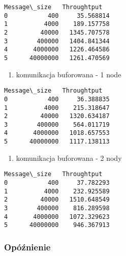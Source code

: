 \documentclass[11pt]{article}
\providecommand{\tightlist}{%
      \setlength{\itemsep}{0pt}\setlength{\parskip}{0pt}}
\begin{document}
            \begin{tcolorbox}[breakable, size=fbox, boxrule=.5pt, pad at break*=1mm, opacityfill=0]
\begin{Verbatim}[commandchars=\\\{\}]
   Message\_size   Throughtput
0           400     35.568814
1          4000    189.157758
2         40000   1345.707578
3        400000   1404.841344
4       4000000   1226.464586
5      40000000   1261.470569
\end{Verbatim}
\end{tcolorbox}
        
    \begin{enumerate}
\def\labelenumi{\arabic{enumi}.}
\setcounter{enumi}{2}
\tightlist
\item
  komunikacja buforowana - 1 node
\end{enumerate}

            \begin{tcolorbox}[breakable, size=fbox, boxrule=.5pt, pad at break*=1mm, opacityfill=0]
\begin{Verbatim}[commandchars=\\\{\}]
   Message\_size   Throughtput
0           400     36.388835
1          4000    215.318647
2         40000   1320.634187
3        400000    564.011719
4       4000000   1018.657553
5      40000000   1117.138113
\end{Verbatim}
\end{tcolorbox}
        
    \begin{enumerate}
\def\labelenumi{\arabic{enumi}.}
\setcounter{enumi}{3}
\tightlist
\item
  komunikacja buforowana - 2 nody
\end{enumerate}

            \begin{tcolorbox}[breakable, size=fbox, boxrule=.5pt, pad at break*=1mm, opacityfill=0]
\begin{Verbatim}[commandchars=\\\{\}]
   Message\_size   Throughtput
0           400     37.782293
1          4000    232.925589
2         40000   1510.648549
3        400000    816.289598
4       4000000   1072.329623
5      40000000    946.367913
\end{Verbatim}
\end{tcolorbox}
        
    \hypertarget{opuxf3ux17anienie}{%
\subsubsection{Opóźnienie}\label{opuxf3ux17anienie}}
\end{document}
